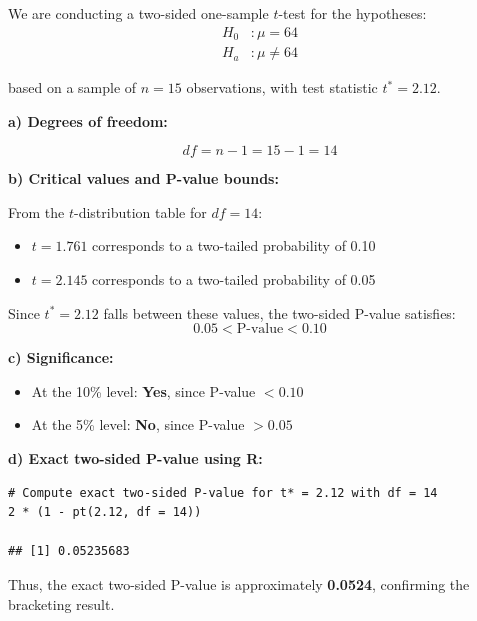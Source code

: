 \begin{example}
We are conducting a two-sided one-sample $t$-test for the hypotheses:
\begin{align*}
H_0 &: \mu = 64 \\
H_a &: \mu \ne 64
\end{align*}

based on a sample of $n = 15$ observations, with test statistic $t^* = 2.12$.

\textbf{a) Degrees of freedom:}

\[
df = n - 1 = 15 - 1 = 14
\]

\textbf{b) Critical values and P-value bounds:}

From the $t$-distribution table for $df = 14$:

\begin{itemize}
  \item $t = 1.761$ corresponds to a two-tailed probability of 0.10
  \item $t = 2.145$ corresponds to a two-tailed probability of 0.05
\end{itemize}

Since $t^* = 2.12$ falls between these values, the two-sided P-value satisfies:
\[
0.05 < \text{P-value} < 0.10
\]

\textbf{c) Significance:}

\begin{itemize}
  \item At the 10\% level: \textbf{Yes}, since P-value $< 0.10$
  \item At the 5\% level: \textbf{No}, since P-value $> 0.05$
\end{itemize}

\textbf{d) Exact two-sided P-value using R:}

\begin{tcolorbox}[colback=gray!10, colframe=black!45, arc=2mm]
\begin{verbatim}
# Compute exact two-sided P-value for t* = 2.12 with df = 14
2 * (1 - pt(2.12, df = 14))

## [1] 0.05235683
\end{verbatim}
\end{tcolorbox}

Thus, the exact two-sided P-value is approximately \textbf{0.0524}, confirming the bracketing result.
\end{example}

